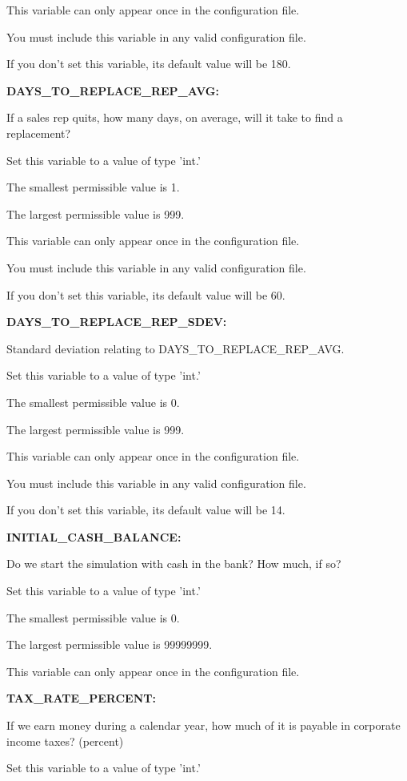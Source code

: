 This variable can only appear once in the configuration file.

You must include  this variable in any valid configuration file.

If you don't set this variable, its default value will be 180.


\textbf{DAYS\_TO\_REPLACE\_REP\_AVG:}


If a sales rep quits, how many days, on average, will it take to find a replacement?

Set this variable to a value of type 'int.'

The smallest permissible value is 1.

The largest permissible value is 999.

This variable can only appear once in the configuration file.

You must include  this variable in any valid configuration file.

If you don't set this variable, its default value will be 60.


\textbf{DAYS\_TO\_REPLACE\_REP\_SDEV:}


Standard deviation relating to DAYS\_TO\_REPLACE\_REP\_AVG.

Set this variable to a value of type 'int.'

The smallest permissible value is 0.

The largest permissible value is 999.

This variable can only appear once in the configuration file.

You must include  this variable in any valid configuration file.

If you don't set this variable, its default value will be 14.


\textbf{INITIAL\_CASH\_BALANCE:}


Do we start the simulation with cash in the bank?  How much, if so?

Set this variable to a value of type 'int.'

The smallest permissible value is 0.

The largest permissible value is 99999999.

This variable can only appear once in the configuration file.


\textbf{TAX\_RATE\_PERCENT:}


If we earn money during a calendar year, how much of it is payable in corporate income taxes? (percent)

Set this variable to a value of type 'int.'

